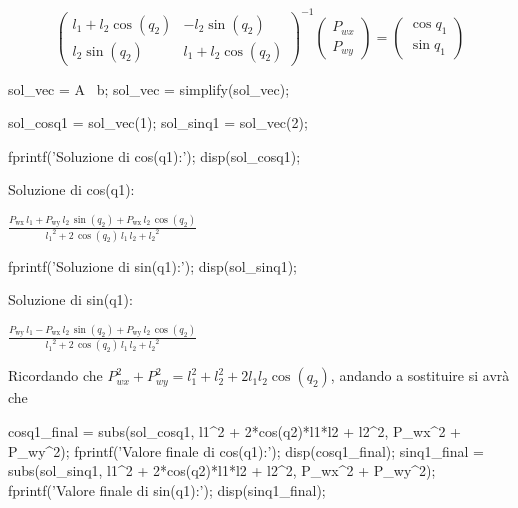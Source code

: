 \documentclass[11pt, a4paper]{article}
\begin{document}
\[
    {\left(\begin{array}{cc}
    l_1 +l_2 \cos(q_2 ) & -l_2 \sin (q_2 )\\
    l_2 \sin (q_2 ) & l_1 +l_2 \cos(q_2 )
    \end{array}\right)}^{-1} \left(\begin{array}{c}
    P_{wx} \\
    P_{wy}
    \end{array}\right)=\left(\begin{array}{c}
    \cos q_1 \\
    \sin q_1
    \end{array}\right)
\]

\begin{matlabcode}
sol_vec = A \ b;
sol_vec = simplify(sol_vec);

sol_cosq1 = sol_vec(1);
sol_sinq1 = sol_vec(2);

fprintf('Soluzione di cos(q1):\n');
disp(sol_cosq1);
\end{matlabcode}
\begin{matlaboutput}
Soluzione di cos(q1):
\end{matlaboutput}
\begin{matlabsymbolicoutput}
$\displaystyle \frac{P_{\textrm{wx}} \,l_1 +P_{\textrm{wy}} \,l_2 \,\sin \left(q_2 \right)+P_{\textrm{wx}} \,l_2 \,\cos \left(q_2 \right)}{{l_1 }^2 +2\,\cos \left(q_2 \right)\,l_1 \,l_2 +{l_2 }^2 }$
\end{matlabsymbolicoutput}
\begin{matlabcode}
fprintf('Soluzione di sin(q1):\n');
disp(sol_sinq1);
\end{matlabcode}
\begin{matlaboutput}
Soluzione di sin(q1):
\end{matlaboutput}
\begin{matlabsymbolicoutput}
$\displaystyle \frac{P_{\textrm{wy}} \,l_1 -P_{\textrm{wx}} \,l_2 \,\sin \left(q_2 \right)+P_{\textrm{wy}} \,l_2 \,\cos \left(q_2 \right)}{{l_1 }^2 +2\,\cos \left(q_2 \right)\,l_1 \,l_2 +{l_2 }^2 }$
\end{matlabsymbolicoutput}

\begin{par}
\begin{flushleft}
Ricordando che $P_{wx}^2 +P_{wy}^2 =l_1^2 +l_2^2 +2l_1 l_2 \cos (q_2 )$, andando a sostituire si avrà che
\end{flushleft}
\end{par}

\begin{matlabcode}
cosq1_final = subs(sol_cosq1, l1^2 + 2*cos(q2)*l1*l2 + l2^2, P_wx^2 + P_wy^2);
fprintf('Valore finale di cos(q1):\n');
disp(cosq1_final);
sinq1_final = subs(sol_sinq1, l1^2 + 2*cos(q2)*l1*l2 + l2^2, P_wx^2 + P_wy^2);
fprintf('Valore finale di sin(q1):\n');
disp(sinq1_final);
\end{matlabcode}
\end{document}
